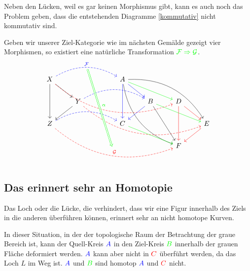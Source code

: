 \documentclass[a4paper]{amsart}
\theoremstyle{definition}
\begin{document}
Neben den Lücken, weil es gar keinen Morphismus gibt, kann es auch noch das Problem geben, dass die entstehenden Diagramme \eqref{kommutativ} nicht kommutativ sind.

Geben wir unserer Ziel-Kategorie wie im nächsten Gemälde gezeigt vier Morphismen, so existiert eine natürliche Transformation 
$\color{green} \mathcal F \Rightarrow \mathcal G$. 
\begin{equation}
	\begin{tikzcd}
		X \arrow[dd] \arrow[dr] \arrow[rrr, blue, dashed, bend left, "\mathcal F"{name=0}] \arrow[rrrrrd, red, dashed, bend right] &&& A \arrow[dd, blue] \arrow[dr, blue] \arrow[dddrr, bend right] \arrow[drr, green] \arrow[ddrrr, bend left]\\ 
		& Y \arrow[dl] \arrow[rrr, blue, dashed, bend left] \arrow[rrrrrd, red, dashed, bend right] &&&B \arrow[dl, blue] \arrow[ddr] \arrow[drr, green] &D \arrow[dd, red] \arrow[dr, red]\\
		Z \arrow[rrr, blue, dashed, bend left] \arrow[rrrrrd, red, dashed, bend right, "\mathcal G"{name=1}] &&&C  \arrow[drr, green] &&& E \arrow[dl, red]\\
		&&&&&F
		\arrow[Rightarrow, green, from=0, to=1,shorten >= 6pt, yshift = -3pt, "\alpha"{yshift=3pt}]
	\end{tikzcd}
\end{equation}

\subsection{Das erinnert sehr an Homotopie}
Das Loch oder die Lücke, die verhindert, dass wir eine Figur innerhalb des Ziels in die anderen überführen können, erinnert sehr an nicht homotope Kurven.


In dieser Situation, in der der topologische Raum der Betrachtung der graue Bereich ist, kann der Quell-Kreis $\color{blue}A$ in den Ziel-Kreis $\color{green}B$ innerhalb der grauen Fläche deformiert werden. $\color{blue}A$ kann aber nicht in $\color{red}C$ überführt werden, da das Loch $L$ im Weg ist. $\color{blue}A$ und $\color{green}B$ sind homotop $\color{blue}A$ und $\color{red}C$ nicht.
\end{document}
